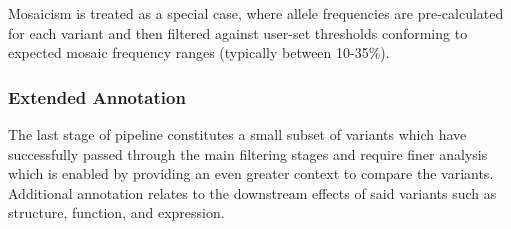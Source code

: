 Mosaicism is treated as a special case, where allele frequencies are pre-calculated for each variant and then filtered against user-set thresholds conforming to expected mosaic frequency ranges (typically between 10-35\%).




\subsubsection{Extended Annotation}

The last stage of pipeline constitutes a small subset of variants which have successfully passed through the main filtering stages and require finer analysis which is enabled by providing an even greater context to compare the variants. Additional annotation relates to the downstream effects of said variants such as structure, function, and expression.

\begin{itemize}
\end{itemize}




